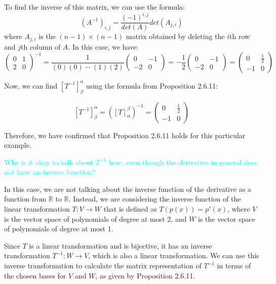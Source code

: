 \documentclass[fontsize=12pt]{scrartcl}
\begin{document}
\noindent
To find the inverse of this matrix, we can use the formula:
$$(A^{-1})_{i, j} = \frac{(-1)^{i, j}}{det(A)}det(A_{j, i}) $$
\noindent
where $A_{j,i}$ is the $(n-1) \times (n-1)$ matrix obtained by deleting the $i$th row and $j$th column of $A$. In this case, we have:
$$\left(\begin{array}{cc} 0 & 1 \\ 2 & 0 \end{array} \right)^{-1} = \frac{1}{(0)(0) - (1)(2)}\left(\begin{array}{cc} 0 & -1 \\ -2 & 0 \end{array} \right) = -\frac{1}{2}\left(\begin{array}{cc} 0 & -1 \\ -2 & 0 \end{array} \right) = \left(\begin{array}{cc} 0 & \frac{1}{2} \\ -1 & 0 \end{array} \right) $$

\noindent
Now, we can find $[T^{-1}]_{\beta}^{\alpha}$ using the formula from Proposition 2.6.11:

$$[T^{-1}]_{\beta}^{\alpha} = ([T]_{\alpha}^{\beta})^{-1} = \left(\begin{array}{cc} 0 & \frac{1}{2} \\ -1 & 0 \end{array} \right) $$

\noindent
Therefore, we have confirmed that Proposition 2.6.11 holds for this particular example.

\newpage

\noindent
\textcolor{cyan}{Why is it okay to talk about $T^{-1}$ here, even though the derivative in general does not have an inverse function?}

\noindent
In this case, we are not talking about the inverse function of the derivative as a function from $\mathbb{R}$ to $\mathbb{R}$. Instead, we are considering the inverse function of the linear transformation $T:V \to W$ that is defined as $T(p(x)) = p'(x)$, where $V$ is the vector space of polynomials of degree at most 2, and $W$ is the vector space of polynomials of degree at most 1.

\noindent
Since $T$ is a linear transformation and is bijective, it has an inverse transformation $T^{-1}: W \to V$, which is also a linear transformation. We can use this inverse transformation to calculate the matrix representation of $T^{-1}$ in terms of the chosen bases for $V$ and $W$, as given by Proposition 2.6.11.
\newpage
\end{document}

